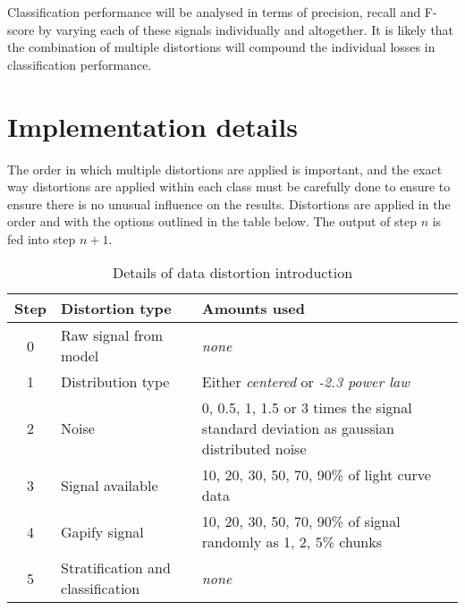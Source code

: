 		Classification performance will be analysed in terms of precision, recall and F-score by varying each of these signals individually and altogether. It is likely that the combination of multiple distortions will compound the individual losses in classification performance.
		
		
		
	\section{Implementation details}
		The order in which multiple distortions are applied is important, and the exact way distortions are applied within each class must be carefully done to ensure to ensure there is no unusual influence on the results. Distortions are applied in the order and with the options outlined in the table below. The output of step $n$ is fed into step $n + 1$.
		
		\begin{table}[ht!]
		\centering
		\begin{tabular}{|c|l|p{}|} \hline
			\textbf{Step} &\textbf{Distortion type} & \textbf{Amounts used} \\ \hline
			0 & Raw signal from model & \emph{none} \\
			1 & Distribution type & Either \emph{centered} or \emph{-2.3 power law} \\
			2 & Noise & 0, 0.5, 1, 1.5 or 3 times the signal standard deviation as gaussian distributed noise\\
			3 & Signal available & 10, 20, 30, 50, 70, 90\% of light curve data \\
			4 & Gapify signal & 10, 20, 30, 50, 70, 90\% of signal randomly as 1, 2, 5\% chunks \\
			5 & Stratification and classification & \emph{none} \\ \hline
		\end{tabular}
		\caption{Details of data distortion introduction}
		\end{table}
			
